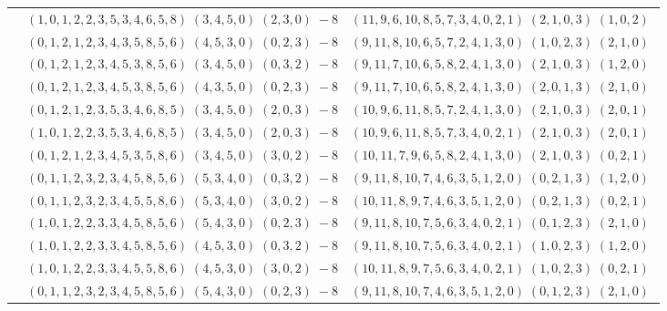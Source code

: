 \documentclass[11pt]{article}
\begin{document}
\begin{longtable}[l]{|c|c|c|}
 \cline{2-3} 
 & $(1 ,0 ,1 ,2 ,2 ,3 ,5 ,3 ,4 ,6 ,5 ,8) \;(3 ,4 ,5 ,0) \;(2 ,3 ,0) \;-8$ & $(11 ,9 ,6 ,10 ,8 ,5 ,7 ,3 ,4 ,0 ,2 ,1) \;(2 ,1 ,0 ,3) \;(1 ,0 ,2) \;$\\ 
 \cline{2-3} 
 & $(0 ,1 ,2 ,1 ,2 ,3 ,4 ,3 ,5 ,8 ,5 ,6) \;(4 ,5 ,3 ,0) \;(0 ,2 ,3) \;-8$ & $(9 ,11 ,8 ,10 ,6 ,5 ,7 ,2 ,4 ,1 ,3 ,0) \;(1 ,0 ,2 ,3) \;(2 ,1 ,0) \;$\\ 
 \cline{2-3} 
 & $(0 ,1 ,2 ,1 ,2 ,3 ,4 ,5 ,3 ,8 ,5 ,6) \;(3 ,4 ,5 ,0) \;(0 ,3 ,2) \;-8$ & $(9 ,11 ,7 ,10 ,6 ,5 ,8 ,2 ,4 ,1 ,3 ,0) \;(2 ,1 ,0 ,3) \;(1 ,2 ,0) \;$\\ 
 \cline{2-3} 
 & $(0 ,1 ,2 ,1 ,2 ,3 ,4 ,5 ,3 ,8 ,5 ,6) \;(4 ,3 ,5 ,0) \;(0 ,2 ,3) \;-8$ & $(9 ,11 ,7 ,10 ,6 ,5 ,8 ,2 ,4 ,1 ,3 ,0) \;(2 ,0 ,1 ,3) \;(2 ,1 ,0) \;$\\ 
 \cline{2-3} 
 & $(0 ,1 ,2 ,1 ,2 ,3 ,5 ,3 ,4 ,6 ,8 ,5) \;(3 ,4 ,5 ,0) \;(2 ,0 ,3) \;-8$ & $(10 ,9 ,6 ,11 ,8 ,5 ,7 ,2 ,4 ,1 ,3 ,0) \;(2 ,1 ,0 ,3) \;(2 ,0 ,1) \;$\\ 
 \cline{2-3} 
 & $(1 ,0 ,1 ,2 ,2 ,3 ,5 ,3 ,4 ,6 ,8 ,5) \;(3 ,4 ,5 ,0) \;(2 ,0 ,3) \;-8$ & $(10 ,9 ,6 ,11 ,8 ,5 ,7 ,3 ,4 ,0 ,2 ,1) \;(2 ,1 ,0 ,3) \;(2 ,0 ,1) \;$\\ 
 \cline{2-3} 
 & $(0 ,1 ,2 ,1 ,2 ,3 ,4 ,5 ,3 ,5 ,8 ,6) \;(3 ,4 ,5 ,0) \;(3 ,0 ,2) \;-8$ & $(10 ,11 ,7 ,9 ,6 ,5 ,8 ,2 ,4 ,1 ,3 ,0) \;(2 ,1 ,0 ,3) \;(0 ,2 ,1) \;$\\ 
 \cline{2-3} 
 & $(0 ,1 ,1 ,2 ,3 ,2 ,3 ,4 ,5 ,8 ,5 ,6) \;(5 ,3 ,4 ,0) \;(0 ,3 ,2) \;-8$ & $(9 ,11 ,8 ,10 ,7 ,4 ,6 ,3 ,5 ,1 ,2 ,0) \;(0 ,2 ,1 ,3) \;(1 ,2 ,0) \;$\\ 
 \cline{2-3} 
 & $(0 ,1 ,1 ,2 ,3 ,2 ,3 ,4 ,5 ,5 ,8 ,6) \;(5 ,3 ,4 ,0) \;(3 ,0 ,2) \;-8$ & $(10 ,11 ,8 ,9 ,7 ,4 ,6 ,3 ,5 ,1 ,2 ,0) \;(0 ,2 ,1 ,3) \;(0 ,2 ,1) \;$\\ 
 \cline{2-3} 
 & $(1 ,0 ,1 ,2 ,2 ,3 ,3 ,4 ,5 ,8 ,5 ,6) \;(5 ,4 ,3 ,0) \;(0 ,2 ,3) \;-8$ & $(9 ,11 ,8 ,10 ,7 ,5 ,6 ,3 ,4 ,0 ,2 ,1) \;(0 ,1 ,2 ,3) \;(2 ,1 ,0) \;$\\ 
 \cline{2-3} 
 & $(1 ,0 ,1 ,2 ,2 ,3 ,3 ,4 ,5 ,8 ,5 ,6) \;(4 ,5 ,3 ,0) \;(0 ,3 ,2) \;-8$ & $(9 ,11 ,8 ,10 ,7 ,5 ,6 ,3 ,4 ,0 ,2 ,1) \;(1 ,0 ,2 ,3) \;(1 ,2 ,0) \;$\\ 
 \cline{2-3} 
 & $(1 ,0 ,1 ,2 ,2 ,3 ,3 ,4 ,5 ,5 ,8 ,6) \;(4 ,5 ,3 ,0) \;(3 ,0 ,2) \;-8$ & $(10 ,11 ,8 ,9 ,7 ,5 ,6 ,3 ,4 ,0 ,2 ,1) \;(1 ,0 ,2 ,3) \;(0 ,2 ,1) \;$\\ 
 \cline{2-3} 
 & $(0 ,1 ,1 ,2 ,3 ,2 ,3 ,4 ,5 ,8 ,5 ,6) \;(5 ,4 ,3 ,0) \;(0 ,2 ,3) \;-8$ & $(9 ,11 ,8 ,10 ,7 ,4 ,6 ,3 ,5 ,1 ,2 ,0) \;(0 ,1 ,2 ,3) \;(2 ,1 ,0) \;$\\ 

\end{longtable}
\end{document}
